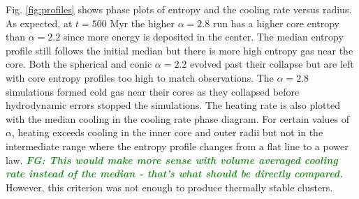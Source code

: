 \documentclass[iop,apjl, twocolappendix]{emulateapj}   %
\def\FG#1{{\textcolor{ForestGreen}{\textbf{\textit{ FG: #1}}}}}
\begin{document}
Fig. \ref{fig:profiles} shows phase plots of entropy and the cooling rate
versus radius. As expected, at $t= 500 \text{ Myr}$ the higher $\alpha=2.8$ run
has a higher core entropy than $\alpha=2.2$ since more energy is deposited in
the center. The median entropy profile still follows the initial median but
there is more high entropy gas near the core. Both the spherical and conic
$\alpha=2.2$ evolved past their collapse but are left with core entropy
profiles too high to match observations. The $\alpha=2.8$ simulations formed
cold gas near their cores as they collapsed before hydrodynamic errors stopped
the simulations.  The heating rate is also plotted with the median cooling in
the cooling rate phase diagram. For certain values of $\alpha$, heating exceeds
cooling in the inner core and outer radii but not in the intermediate range
where the entropy profile changes from a flat line to a power law. \FG{This
would make more sense with volume averaged cooling rate instead of the median -
that's what should be directly compared.} However, this criterion was not
enough to produce thermally stable clusters.
\end{document}
